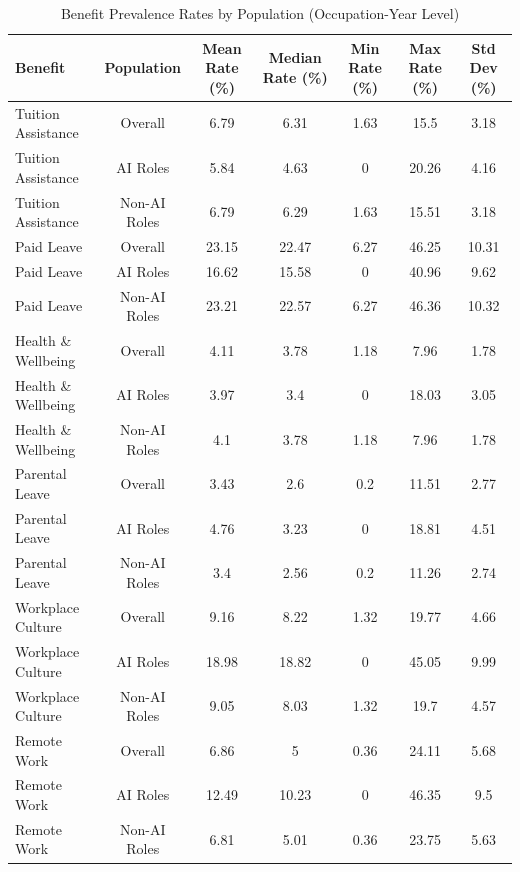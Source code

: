 \begin{table}[htbp]
\caption{Benefit Prevalence Rates by Population (Occupation-Year Level)}
\label{tab:benefit_prevalence_rates}
\begin{tabular}{lcccccc}
\hline\hline
Benefit & Population & Mean Rate (\%) & Median Rate (\%) & Min Rate (\%) & Max Rate (\%) & Std Dev (\%) \\
\hline
Tuition Assistance & Overall & 6.79 & 6.31 & 1.63 & 15.5 & 3.18 \\
Tuition Assistance & AI Roles & 5.84 & 4.63 & 0 & 20.26 & 4.16 \\
Tuition Assistance & Non-AI Roles & 6.79 & 6.29 & 1.63 & 15.51 & 3.18 \\
Paid Leave & Overall & 23.15 & 22.47 & 6.27 & 46.25 & 10.31 \\
Paid Leave & AI Roles & 16.62 & 15.58 & 0 & 40.96 & 9.62 \\
Paid Leave & Non-AI Roles & 23.21 & 22.57 & 6.27 & 46.36 & 10.32 \\
Health \& Wellbeing & Overall & 4.11 & 3.78 & 1.18 & 7.96 & 1.78 \\
Health \& Wellbeing & AI Roles & 3.97 & 3.4 & 0 & 18.03 & 3.05 \\
Health \& Wellbeing & Non-AI Roles & 4.1 & 3.78 & 1.18 & 7.96 & 1.78 \\
Parental Leave & Overall & 3.43 & 2.6 & 0.2 & 11.51 & 2.77 \\
Parental Leave & AI Roles & 4.76 & 3.23 & 0 & 18.81 & 4.51 \\
Parental Leave & Non-AI Roles & 3.4 & 2.56 & 0.2 & 11.26 & 2.74 \\
Workplace Culture & Overall & 9.16 & 8.22 & 1.32 & 19.77 & 4.66 \\
Workplace Culture & AI Roles & 18.98 & 18.82 & 0 & 45.05 & 9.99 \\
Workplace Culture & Non-AI Roles & 9.05 & 8.03 & 1.32 & 19.7 & 4.57 \\
Remote Work & Overall & 6.86 & 5 & 0.36 & 24.11 & 5.68 \\
Remote Work & AI Roles & 12.49 & 10.23 & 0 & 46.35 & 9.5 \\
Remote Work & Non-AI Roles & 6.81 & 5.01 & 0.36 & 23.75 & 5.63 \\
\hline\hline
\end{tabular}
\end{table}
